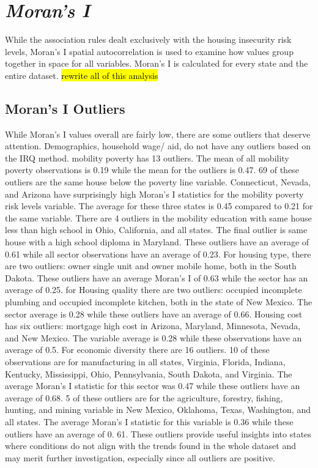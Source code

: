 \section{\textit{Moran's I}}




While the association rules dealt exclusively with the housing insecurity risk levels, Moran’s I spatial autocorrelation is used to examine how values group together in space for all variables. Moran’s I is calculated for every state and the entire dataset.  \hl{rewrite all of this analysis}

%

\subsection{Moran's I Outliers}
While Moran's I values overall are fairly low, there are some outliers that deserve attention. Demographics, household wage/ aid, do not have any outliers based on the IRQ method.  mobility poverty has 13 outliers. The mean of all mobility poverty observations is 0.19 while the mean for the outliers is 0.47. 69 \pct of these outliers are the same house below the poverty line variable. Connecticut, Nevada, and Arizona have surprisingly high Moran’s I statistics for the mobility poverty risk levels variable. The average for these three states is 0.45 compared to 0.21 for the same variable. There are 4 outliers in the mobility education  with same house less than high school in Ohio, California, and all states. The final outlier is same house with a high school diploma in Maryland. These outliers have an average of 0.61 while all sector observations have an average of 0.23. For housing type, there are two outliers: owner single unit and owner mobile home, both in the South Dakota. These outliers have an average Moran’s I of 0.63 while the sector has an average of 0.25. for Housing quality there are two outliers: occupied incomplete plumbing and occupied incomplete kitchen, both in the state of New Mexico. The sector average is 0.28 while these outliers have an average of 0.66. Housing cost has six outliers: mortgage high cost in Arizona, Maryland, Minnesota, Nevada, and New Mexico. The variable average is 0.28 while these observations have an average of 0.5. For economic diversity there are 16 outliers. 10 of these observations are for manufacturing in all states, Virginia, Florida, Indiana, Kentucky, Mississippi, Ohio, Pennsylvania, South Dakota, and Virginia. The average Moran’s I statistic for this sector was 0.47 while these outliers have an average of 0.68. 5 of these outliers are for the agriculture, forestry, fishing, hunting, and mining variable in New Mexico, Oklahoma, Texas, Washington, and all states. The average Moran’s I statistic for this variable is 0.36 while these outliers have an average of 0. 61. These outliers provide useful insights into states where conditions do not align with the trends found in the whole dataset and may merit further investigation, especially since all outliers are positive.  

